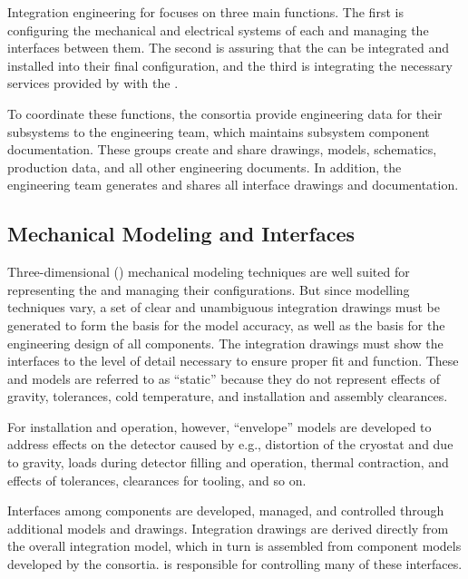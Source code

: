Integration engineering for  focuses on three main functions. The first is  configuring the
mechanical and electrical systems of each  and managing
the interfaces between them.  The second 
is assuring that the  can be integrated and
installed into their final configuration, and the third is
integrating the necessary services provided by  
with the . 

To coordinate these functions, the consortia provide engineering data for their
subsystems to the  engineering team, which maintains subsystem
component documentation.  
These groups create and share
drawings, models, schematics, production data, and all other
engineering documents. In addition, the  engineering team
generates and shares all interface drawings and documentation.
 
\subsection{Mechanical Modeling and Interfaces}
\label{sec:es-tc-mech}

Three-dimensional (\threed) mechanical modeling techniques are well suited 
for representing the  and managing their configurations.
But since  \threed modelling techniques vary, a set
of clear and unambiguous \twod integration drawings must be generated to form
the basis for the \threed model accuracy, as well as the basis for the engineering
design of all components. The \twod integration drawings must show the 
interfaces to the level of detail necessary to ensure proper fit and function.  These \threed and 
\twod models are referred to as ``static'' because they do not represent effects of gravity, tolerances, cold
temperature, and installation and assembly clearances.

For installation and operation, however, ``envelope'' models  are developed to 
address effects on the detector 
caused by e.g., distortion of the cryostat and  due to gravity, loads  during 
detector filling and operation, thermal contraction,  and effects of tolerances, clearances for tooling, and so on.

Interfaces among components are developed, managed, and controlled through additional models and drawings. 
Integration drawings are derived directly from the overall
integration model, which in turn is assembled from
component models developed by the consortia.
 is responsible for controlling many of these interfaces. 

